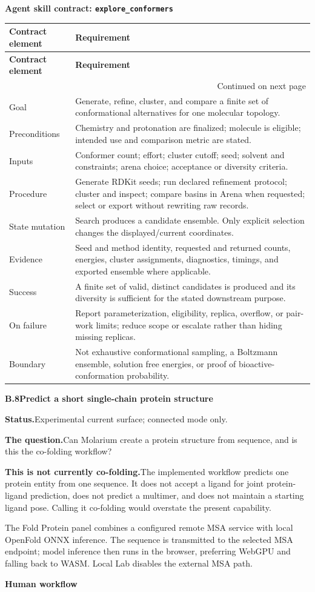 \documentclass[10pt,letterpaper]{article}
\makeatletter
\newcommand{\code}[1]{\texttt{#1}}
\newcommand{\lead}[1]{\textbf{#1}\hspace{0.35em}}
\newcommand{\subhead}[1]{%
  \par\needspace{2\baselineskip}\vspace{2.5pt}%
  {\fontsize{10.91}{13.1}\selectfont\bfseries #1}\par\vspace{-1.5pt}}
\newcommand{\workflowsection}[4]{%
  \par\needspace{5\baselineskip}\vspace{7.5pt}%
  {\fontsize{10.91}{13.1}\selectfont\bfseries #1\hspace{1.1em}#2}\par\vspace{2pt}%
  \lead{Status.}#3.\par\vspace{-3.5pt}%
  \lead{The question.}#4\par}
\newenvironment{skillcontract}[1]{%
  \par\needspace{5\baselineskip}\vspace{2pt}%
  {\fontsize{10.91}{13.1}\selectfont\bfseries Agent skill contract: \code{#1}}\par\vspace{1pt}%
  \fontsize{8.4}{10}\selectfont
  \begin{longtable}{@{}K V@{}}
  \toprule
  \textbf{Contract element} & \textbf{Requirement}\\
  \midrule
  \endfirsthead
  \toprule
  \textbf{Contract element} & \textbf{Requirement}\\
  \midrule
  \endhead
  \midrule
  \multicolumn{2}{r}{\footnotesize Continued on next page}\\
  \endfoot
  \bottomrule
  \endlastfoot
}{%
  \end{longtable}
  \normalsize\fontsize{9.96}{11.95}\selectfont}
\newcommand{\contractrow}[2]{#1 & #2\\}
\makeatother
\begin{document}
\begin{skillcontract}{explore\_conformers}
\contractrow{Goal}{Generate, refine, cluster, and compare a finite set of conformational alternatives for one molecular topology.}
\contractrow{Preconditions}{Chemistry and protonation are finalized; molecule is eligible; intended use and comparison metric are stated.}
\contractrow{Inputs}{Conformer count; effort; cluster cutoff; seed; solvent and constraints; arena choice; acceptance or diversity criteria.}
\contractrow{Procedure}{Generate RDKit seeds; run declared refinement protocol; cluster and inspect; compare basins in Arena when requested; select or export without rewriting raw records.}
\contractrow{State mutation}{Search produces a candidate ensemble. Only explicit selection changes the displayed/current coordinates.}
\contractrow{Evidence}{Seed and method identity, requested and returned counts, energies, cluster assignments, diagnostics, timings, and exported ensemble where applicable.}
\contractrow{Success}{A finite set of valid, distinct candidates is produced and its diversity is sufficient for the stated downstream purpose.}
\contractrow{On failure}{Report parameterization, eligibility, replica, overflow, or pair-work limits; reduce scope or escalate rather than hiding missing replicas.}
\contractrow{Boundary}{Not exhaustive conformational sampling, a Boltzmann ensemble, solution free energies, or proof of bioactive-conformation probability.}
\end{skillcontract}

\workflowsection{B.8}{Predict a short single-chain protein structure}{Experimental current surface; connected mode only}{Can Molarium create a protein structure from sequence, and is this the co-folding workflow?}

\lead{This is not currently co-folding.}The implemented workflow predicts one protein entity from one sequence. It does not accept a ligand for joint protein-ligand prediction, does not predict a multimer, and does not maintain a starting ligand pose. Calling it co-folding would overstate the present capability.

The Fold Protein panel combines a configured remote MSA service with local OpenFold ONNX inference. The sequence is transmitted to the selected MSA endpoint; model inference then runs in the browser, preferring WebGPU and falling back to WASM. Local Lab disables the external MSA path.

\subhead{Human workflow}
\end{document}
